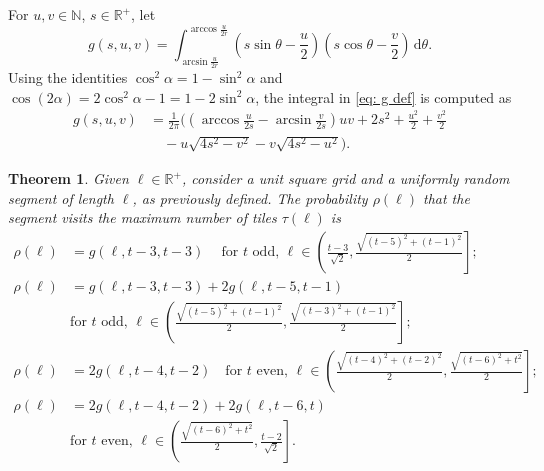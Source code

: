 \documentclass[12pt, a4paper]{article}
\newcommand{\diff}{\,\mathrm d}
\newcommand{\funt}{\tau} %
\newcommand{\probmax}{\rho} %
\newcommand{\len}{\ell} %
\newcommand{\tiles}{t} %
\newcommand{\genvar}{s}
\newtheorem{theorem}{Theorem}%
\begin{document}
For $u, v \in \mathbb N$, $\genvar \in \mathbb R^+$, let
\begin{equation}
\label{eq: g def}
g(\genvar, u, v) = \int_{\arcsin \frac u {2r}}^{\arccos \frac u {2r}} \left( \genvar \sin \theta - \frac u 2 \right) \left( \genvar \cos \theta - \frac v 2 \right) \diff \theta.
\end{equation}
Using the identities $\cos^2 \alpha = 1-\sin^2 \alpha$ and $\cos(2\alpha) = 2\cos^2\alpha-1 = 1 - 2\sin^2\alpha$, the integral in \eqref{eq: g def} is computed as
\begin{equation}
\label{eq: g fin}
\begin{split}
g(\genvar, u, v) &= \frac 1 {2\pi} \biggl(
\left(\arccos\frac{u}{2\genvar}-\arcsin\frac{v}{2\genvar}\right) u v + 2\genvar^2 + \frac{u^2} 2 + \frac{v^2} 2 \\
& \quad  - u \sqrt{4\genvar^2-v^2} - v \sqrt{4\genvar^2-u^2} \biggr).
\end{split}
\end{equation}

\begin{theorem}
\label{theo: probmax, sq}
Given $\len \in \mathbb R^+$, consider a unit square grid and a uniformly random segment of length $\len$, as previously defined. The probability $\probmax(\len)$ that the segment visits the maximum number of tiles $\funt(\len)$ is
\begin{equation}
\label{eq: probmax}
\begin{split}
\probmax(\len) & = g\left(\len, 
\tiles-3, \tiles-3 \right) \quad\ \text{for } \tiles \text{ odd, } \textstyle \len \in \left( \frac{\tiles-3}{\sqrt{2}}, \frac{\sqrt{(\tiles-5)^2+(\tiles-1)^2}} 2 \right]; \\
\probmax(\len) & = g\left(\len, \tiles-3, \tiles-3 \right) + 2 g\left(\len, \tiles-5, \tiles-1 \right) \\
& \text{for } \tiles \text{ odd, } \textstyle \len \in \left (\frac{\sqrt{(\tiles-5)^2+(\tiles-1)^2}} 2,  \frac{\sqrt{(\tiles-3)^2+(\tiles-1)^2}} 2 \right]; \\
\probmax(\len) & = 2 g\left(\len, \tiles-4, \tiles-2 \right) \quad \text{for } \tiles \text{ even, } \textstyle \len \in \left( \frac{\sqrt{(\tiles-4)^2+(\tiles-2)^2}} 2, \frac{\sqrt{(\tiles-6)^2+\tiles^2}} 2 \right]; \\
\probmax(\len) & = 2 g\left(\len, \tiles-4, \tiles-2 \right) + 2 g\left(\len, \tiles-6, \tiles \right) \\
& \text{for } \tiles \text{ even, } \textstyle \len \in \left( \frac{\sqrt{(\tiles-6)^2+\tiles^2}} 2, \frac{\tiles-2}{\sqrt{2}} \right].
\end{split}
\end{equation}
\end{theorem}
\end{document}
